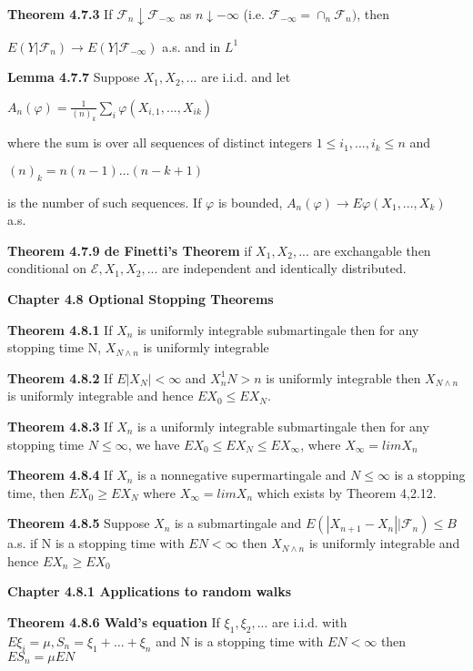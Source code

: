 \documentclass{article}
\newcommand\tab[1][1cm]{\hspace*{#1}}
\begin{document}
\textbf {Theorem 4.7.3} If $\mathcal{F}_n \downarrow \mathcal{F}_{-\infty}$ as $n \downarrow -\infty$ (i.e. $\mathcal{F}_{-\infty} = \cap_{n} \mathcal{F}_n)$, then
\begin{center}
$E(Y|\mathcal{F}_n) \to E(Y|\mathcal{F}_{-\infty})$ \tab a.s. and in $L^1$
\end{center}

\textbf {Lemma 4.7.7} Suppose $X_1 , X_2,...$ are i.i.d. and let 
\begin{center}
$A_n(\varphi) = \frac{1}{(n)_k} \sum_i \varphi(X_{i,1} ,..., X_{ik})$
\end{center}
where the sum is over all sequences of distinct integers $1 \leq i_1 ,..., i_k \leq n$ and 
\begin{center}
$(n)_k = n(n - 1) \dots (n - k+1)$
\end{center}
is the number of such sequences. If $\varphi$ is bounded, $A_n(\varphi) \to E\varphi(X_1 ,..., X_k)$ a.s.

\textbf {Theorem 4.7.9 de Finetti's Theorem} if $X_1 , X_2 ,...$ are exchangable then conditional on $\mathcal{E}, X_1 , X_2 ,...$ are independent and identically distributed.

\textbf {Chapter 4.8 Optional Stopping Theorems}

\textbf {Theorem 4.8.1} If $X_n$ is uniformly integrable submartingale then for any stopping time N, $X_{N \land n}$ is uniformly integrable

\textbf {Theorem 4.8.2} If $E|X_N| < \infty$ and $X_n^1{N>n}$ is uniformly integrable then $X_{N \land n}$ is uniformly integrable and hence $EX_0 \leq EX_N$.

\textbf {Theorem 4.8.3} If $X_n$ is a uniformly integrable submartingale then for any stopping time $N \leq \infty$, we have $EX_0 \leq EX_N \leq EX_\infty$, where $X_\infty = lim X_n$

\textbf {Theorem 4.8.4} If $X_n$ is a nonnegative supermartingale and $N \leq \infty$ is a stopping time, then $EX_0 \geq EX_N$ where $X_\infty = lim X_n$ which exists by Theorem 4,2.12.

\textbf {Theorem 4.8.5} Suppose $X_n$ is a submartingale and $E(|X_{n+1} - X_n || \mathcal{F}_n) \leq B$ a.s. if N is a stopping time with $EN < \infty$ then $X_{N \land n}$ is uniformly integrable and hence $EX_n \geq EX_0$

\textbf {Chapter 4.8.1 Applications to random walks}

\textbf {Theorem 4.8.6 Wald's equation} If $\xi_1 , \xi_2 ,...$ are i.i.d. with $E\xi_i = \mu, S_n = \xi_1 + \dots + \xi_n$ and N is a stopping time with $EN < \infty$ then $ES_n = \mu EN$
\end{document}
